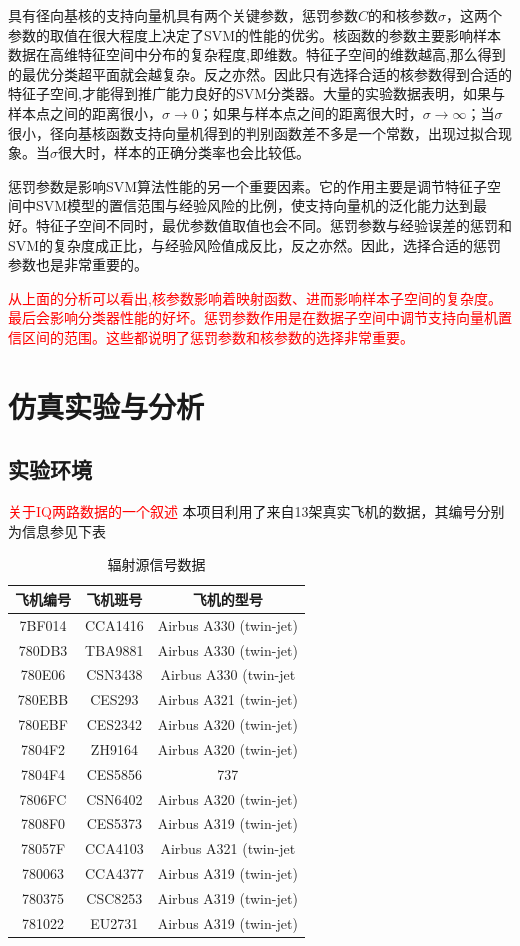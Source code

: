 具有径向基核的支持向量机具有两个关键参数，惩罚参数$C$的和核参数$\sigma$，这两个参数的取值在很大程度上决定了SVM的性能的优劣。核函数的参数主要影响样本数据在高维特征空间中分布的复杂程度,即维数。特征子空间的维数越高,那么得到的最优分类超平面就会越复杂。反之亦然。因此只有选择合适的核参数得到合适的特征子空间,才能得到推广能力良好的SVM分类器。大量的实验数据表明，如果与样本点之间的距离很小，$\sigma \rightarrow 0$；如果与样本点之间的距离很大时，$\sigma \rightarrow \infty$；当$\sigma$很小，径向基核函数支持向量机得到的判别函数差不多是一个常数，出现过拟合现象。当$\sigma$很大时，样本的正确分类率也会比较低。

惩罚参数是影响SVM算法性能的另一个重要因素。它的作用主要是调节特征子空间中SVM模型的置信范围与经验风险的比例，使支持向量机的泛化能力达到最好。特征子空间不同时，最优参数值取值也会不同。惩罚参数与经验误差的惩罚和SVM的复杂度成正比，与经验风险值成反比，反之亦然。因此，选择合适的惩罚参数也是非常重要的。

\textcolor{red}{从上面的分析可以看出,核参数影响着映射函数、进而影响样本子空间的复杂度。最后会影响分类器性能的好坏。惩罚参数作用是在数据子空间中调节支持向量机置信区间的范围。这些都说明了惩罚参数和核参数的选择非常重要。
}
\section{仿真实验与分析}
\subsection{实验环境}
\textcolor{red}{关于IQ两路数据的一个叙述}
本项目利用了来自13架真实飞机的数据，其编号分别为信息参见下表
\begin{table}[H]
	\renewcommand{\arraystretch}{1.3}
	\caption{辐射源信号数据}
	\centering
	\begin{tabular}{c|c|c}
		\hline
		 飞机编号 & 飞机班号 & 飞机的型号  \\
		 \hline
		 7BF014 & CCA1416 & Airbus A330 (twin-jet)\\
		 780DB3 & TBA9881 & Airbus A330 (twin-jet) \\
		 780E06 & CSN3438 & Airbus A330 (twin-jet\\
		 780EBB & CES293 & 	Airbus A321 (twin-jet)\\
		 780EBF & CES2342 & Airbus A320 (twin-jet)\\
		 7804F2 & ZH9164 & Airbus A320 (twin-jet)\\
		 7804F4 & CES5856 & 737\\
		 7806FC & CSN6402 & Airbus A320 (twin-jet)\\
		 7808F0 & CES5373 & Airbus A319 (twin-jet)\\
		 78057F & CCA4103 & Airbus A321 (twin-jet\\
		 780063 & CCA4377 & Airbus A319 (twin-jet)\\
		 780375 & CSC8253 & Airbus A319 (twin-jet)	\\
		 781022 & EU2731 & Airbus A319 (twin-jet)\\
		 \hline
	\end{tabular}
\end{table}


